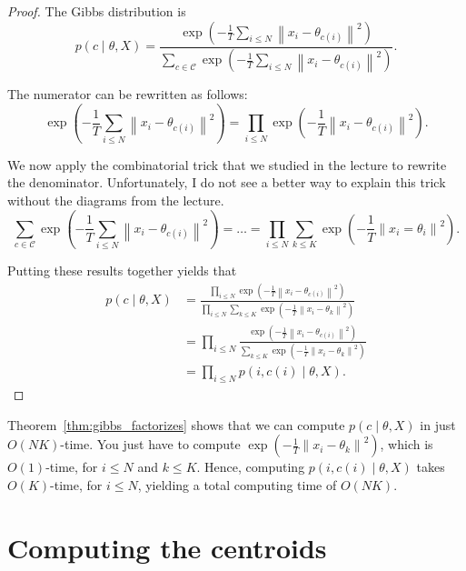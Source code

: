 \begin{proof}
The Gibbs distribution is
%
\begin{equation}
p(c \mid \theta, X) = \frac{\exp\left(- \frac{1}{T}\sum_{i \leq N}\left\|x_i - \theta_{c(i)}\right\|^2\right)}{\sum_{c \in \mathcal{C}}\exp\left(- \frac{1}{T}\sum_{i \leq N}\left\|x_i - \theta_{c(i)}\right\|^2\right)}.
\end{equation}

The numerator can be rewritten as follows:
%
\begin{equation}
\exp\left(- \frac{1}{T}\sum_{i \leq N}\left\|x_i - \theta_{c(i)}\right\|^2\right) = \prod_{i \leq N}\exp\left(- \frac{1}{T}\left\|x_i - \theta_{c(i)}\right\|^2\right).
\end{equation}

We now apply the combinatorial trick that we studied in the lecture
to rewrite the denominator. Unfortunately, I do not see a better way to explain this trick without the diagrams from the lecture.
%
\begin{equation}
\sum_{c \in \mathcal{C}} \exp\left(- \frac{1}{T}\sum_{i \leq N}\left\|x_i - \theta_{c(i)}\right\|^2\right) = \ldots = \prod_{i \leq N} \sum_{k \leq K} \exp\left(-\frac{1}{T}\left\|x_i = \theta_i\right\|^2\right).
\end{equation}

Putting these results together yields that
%
\begin{align}
p(c \mid \theta, X) &= \frac{\prod_{i \leq N}\exp\left(- \frac{1}{T}\left\|x_i - \theta_{c(i)}\right\|^2\right)}{\prod_{i \leq N}\sum_{k \leq K}\exp\left(- \frac{1}{T}\left\|x_i - \theta_{k}\right\|^2\right)}\\
&= \prod_{i \leq N}\frac{\exp\left(- \frac{1}{T}\left\|x_i - \theta_{c(i)}\right\|^2\right)}{\sum_{k \leq K}\exp\left(- \frac{1}{T}\left\|x_i - \theta_{k}\right\|^2\right)}\\
&= \prod_{i \leq N}p(i, c(i) \mid \theta, X).
\end{align}
\end{proof} 

Theorem~\ref{thm:gibbs_factorizes} shows that we can compute $p(c \mid \theta, X)$ in just $O(NK)$-time.
You just have to compute $\exp\left(- \frac{1}{T}\left\|x_i - \theta_k\right\|^2\right)$, which is $O(1)$-time, for $i \leq N$ and $k \leq K$. Hence, computing $p(i, c(i) \mid \theta, X)$ takes $O(K)$-time, for $i \leq N$, yielding a total computing time of $O(NK)$.

\section{Computing the centroids}
\label{sec:computing_centroids_da}

